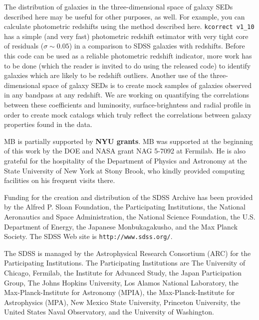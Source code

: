 \documentclass[10pt,preprint]{aastex}
\newcommand{\kversion}{{\tt v1\_10}}
\begin{document}
The distribution of galaxies in the three-dimensional space of galaxy
SEDs described here may be useful for other purposes, as well. For
example, you can calculate photometric redshifts using the method
described here. {\tt kcorrect \kversion} has a simple (and very fast)
photometric redshift estimator with very tight core of residuals
($\sigma \sim 0.05$) in a comparison to SDSS galaxies with redshifts.
Before this code can be used as a reliable photometric redshift
indicator, more work has to be done (which the reader is invited to do
using the released code) to identify galaxies which are likely to be
redshift outliers. Another use of the three-dimensional space of
galaxy SEDs is to create mock samples of galaxies observed in any
bandpass at any redshift. We are working on quantifying the
correlations between these coefficients and luminosity,
surface-brighntess and radial profile in order to create mock catalogs
which truly reflect the correlations between galaxy properties found
in the data. 

\acknowledgments

MB is partially supported by {\bf NYU grants}.
MB was supported at the beginning of this work by the DOE and NASA
grant NAG 5-7092 at Fermilab. He is also grateful for the hospitality
of the Department of Physics and Astronomy at the State University of
New York at Stony Brook, who kindly provided computing facilities on
his frequent visits there. 

Funding for the creation and distribution of the SDSS Archive has been
provided by the Alfred P. Sloan Foundation, the Participating
Institutions, the National Aeronautics and Space Administration, the
National Science Foundation, the U.S. Department of Energy, the
Japanese Monbukagakusho, and the Max Planck Society. The SDSS Web site
is {\tt http://www.sdss.org/}.

The SDSS is managed by the Astrophysical Research Consortium (ARC) for
the Participating Institutions. The Participating Institutions are The
University of Chicago, Fermilab, the Institute for Advanced Study, the
Japan Participation Group, The Johns Hopkins University, Los Alamos
National Laboratory, the Max-Planck-Institute for Astronomy (MPIA),
the Max-Planck-Institute for Astrophysics (MPA), New Mexico State
University, Princeton University, the United States Naval Observatory,
and the University of Washington.
 
\begin{thebibliography}{DUM}

\end{thebibliography}

\newpage

%


\end{document}
